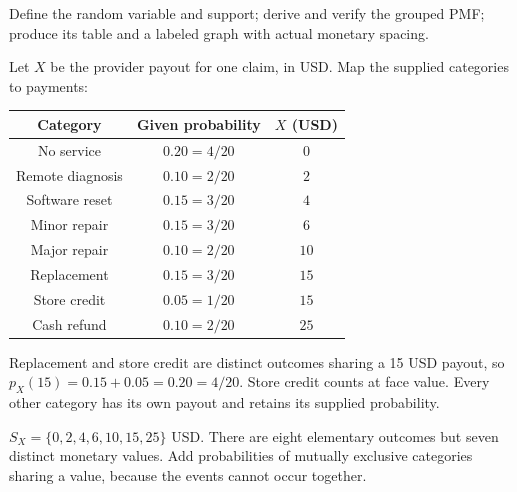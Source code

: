 Define the random variable and support; derive and verify the grouped PMF; produce its table and a labeled graph with actual monetary spacing.

Let $X$ be the provider payout for one claim, in USD. Map the supplied categories to payments:

\begin{center}
\begin{tabular}{ccc}\toprule
Category & Given probability & $X$ (USD)\\\midrule
No service & $0.20=4/20$ & $0$\\
Remote diagnosis & $0.10=2/20$ & $2$\\
Software reset & $0.15=3/20$ & $4$\\
Minor repair & $0.15=3/20$ & $6$\\
Major repair & $0.10=2/20$ & $10$\\
Replacement & $0.15=3/20$ & $15$\\
Store credit & $0.05=1/20$ & $15$\\
Cash refund & $0.10=2/20$ & $25$\\
\bottomrule\end{tabular}
\end{center}

Replacement and store credit are distinct outcomes sharing a 15 USD payout, so $p_X(15)=0.15+0.05=0.20=4/20$. Store credit counts at face value. Every other category has its own payout and retains its supplied probability.

$S_X=\{0,2,4,6,10,15,25\}$ USD. There are eight elementary outcomes but seven distinct monetary values. Add probabilities of mutually exclusive categories sharing a value, because the events cannot occur together.

